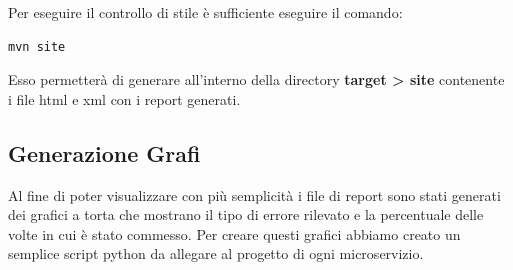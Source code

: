 Per eseguire il controllo di stile è sufficiente eseguire il comando:
\begin{lstlisting}[style=terminal, 
	caption={Avvio controllo checkstyle}]
mvn site
\end{lstlisting}

Esso permetterà di generare all'interno della directory \textbf{target > site} contenente i file html e xml con i report generati.



\subsection{Generazione Grafi}
Al fine di poter visualizzare con più semplicità i file di report sono stati generati dei grafici a torta che mostrano il tipo di errore rilevato e la percentuale delle volte in cui è stato commesso.
Per creare questi grafici abbiamo creato un semplice script python da allegare al progetto di ogni microservizio. 
